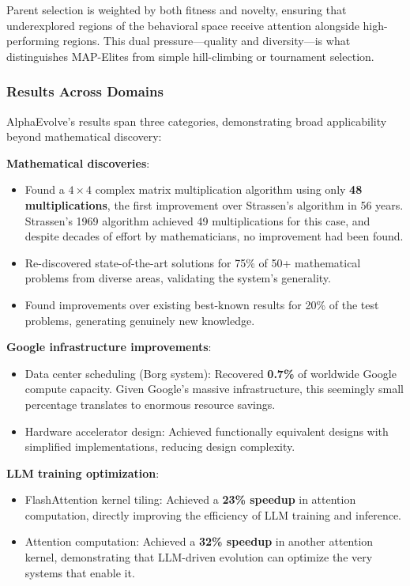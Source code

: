 Parent selection is weighted by both fitness and novelty, ensuring that underexplored regions of the behavioral space receive attention alongside high-performing regions. This dual pressure---quality and diversity---is what distinguishes MAP-Elites from simple hill-climbing or tournament selection.

\subsubsection{Results Across Domains}

AlphaEvolve's results span three categories, demonstrating broad applicability beyond mathematical discovery:

\textbf{Mathematical discoveries}:
\begin{itemize}
\item Found a $4\times 4$ complex matrix multiplication algorithm using only \textbf{48 multiplications}, the first improvement over Strassen's algorithm in 56 years. Strassen's 1969 algorithm achieved 49 multiplications for this case, and despite decades of effort by mathematicians, no improvement had been found.
\item Re-discovered state-of-the-art solutions for 75\% of 50+ mathematical problems from diverse areas, validating the system's generality.
\item Found improvements over existing best-known results for 20\% of the test problems, generating genuinely new knowledge.
\end{itemize}

\textbf{Google infrastructure improvements}:
\begin{itemize}
\item Data center scheduling (Borg system): Recovered \textbf{0.7\%} of worldwide Google compute capacity. Given Google's massive infrastructure, this seemingly small percentage translates to enormous resource savings.
\item Hardware accelerator design: Achieved functionally equivalent designs with simplified implementations, reducing design complexity.
\end{itemize}

\textbf{LLM training optimization}:
\begin{itemize}
\item FlashAttention kernel tiling: Achieved a \textbf{23\% speedup} in attention computation, directly improving the efficiency of LLM training and inference.
\item Attention computation: Achieved a \textbf{32\% speedup} in another attention kernel, demonstrating that LLM-driven evolution can optimize the very systems that enable it.
\end{itemize}

